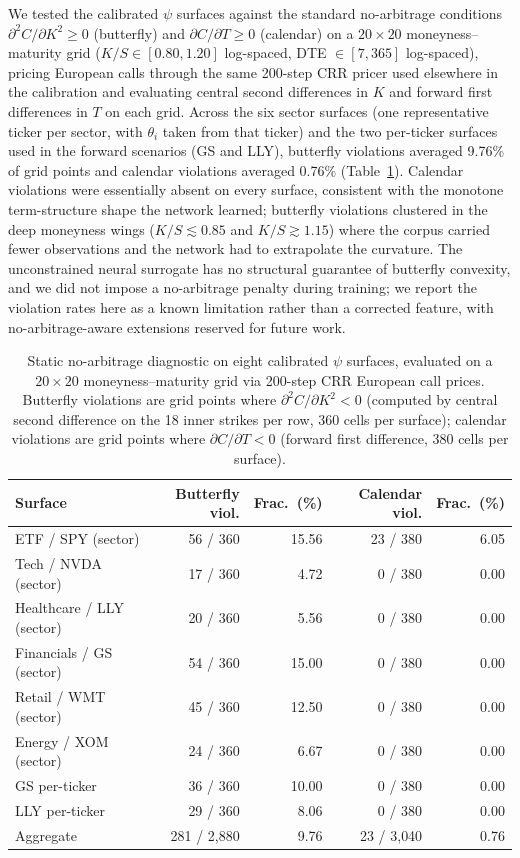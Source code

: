 We tested the calibrated $\psi$ surfaces against the standard no-arbitrage conditions $\partial^2 C/\partial K^2 \geq 0$ (butterfly) and $\partial C/\partial T \geq 0$ (calendar) on a $20\times 20$ moneyness--maturity grid ($K/S \in [0.80, 1.20]$ log-spaced, DTE $\in [7, 365]$ log-spaced), pricing European calls through the same 200-step CRR pricer used elsewhere in the calibration and evaluating central second differences in $K$ and forward first differences in $T$ on each grid. Across the six sector surfaces (one representative ticker per sector, with $\theta_i$ taken from that ticker) and the two per-ticker surfaces used in the forward scenarios (GS and LLY), butterfly violations averaged 9.76\% of grid points and calendar violations averaged 0.76\% (Table~\ref{tab:static_arb}). Calendar violations were essentially absent on every surface, consistent with the monotone term-structure shape the network learned; butterfly violations clustered in the deep moneyness wings ($K/S \lesssim 0.85$ and $K/S \gtrsim 1.15$) where the corpus carried fewer observations and the network had to extrapolate the curvature. The unconstrained neural surrogate has no structural guarantee of butterfly convexity, and we did not impose a no-arbitrage penalty during training; we report the violation rates here as a known limitation rather than a corrected feature, with no-arbitrage-aware extensions reserved for future work.

\begin{table}[ht]
\centering
\caption{Static no-arbitrage diagnostic on eight calibrated $\psi$ surfaces, evaluated on a $20\times 20$ moneyness--maturity grid via 200-step CRR European call prices. Butterfly violations are grid points where $\partial^2 C/\partial K^2 < 0$ (computed by central second difference on the 18 inner strikes per row, 360 cells per surface); calendar violations are grid points where $\partial C/\partial T < 0$ (forward first difference, 380 cells per surface).}\label{tab:static_arb}
\begin{tabular}{lrrrr}
\toprule
Surface             & Butterfly viol. & Frac.\ (\%) & Calendar viol. & Frac.\ (\%) \\
\midrule
ETF / SPY (sector)        &  56 / 360 & 15.56 & 23 / 380 & 6.05 \\
Tech / NVDA (sector)      &  17 / 360 & 4.72 & 0 / 380 & 0.00 \\
Healthcare / LLY (sector) &  20 / 360 & 5.56 & 0 / 380 & 0.00 \\
Financials / GS (sector)  &  54 / 360 & 15.00 & 0 / 380 & 0.00 \\
Retail / WMT (sector)     &  45 / 360 & 12.50 & 0 / 380 & 0.00 \\
Energy / XOM (sector)     &  24 / 360 & 6.67 & 0 / 380 & 0.00 \\
GS per-ticker             &  36 / 360 & 10.00 & 0 / 380 & 0.00 \\
LLY per-ticker            &  29 / 360 & 8.06 & 0 / 380 & 0.00 \\
\midrule
Aggregate                 & 281 / 2{,}880 & 9.76 & 23 / 3{,}040 & 0.76 \\
\bottomrule
\end{tabular}
\end{table}

